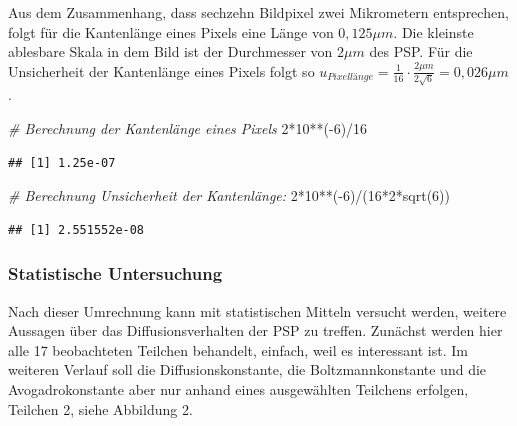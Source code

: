 \documentclass[
  9pt,
]{article}
\newenvironment{Shaded}{\begin{snugshade}}{\end{snugshade}}
\newcommand{\CommentTok}[1]{\textcolor[rgb]{0.56,0.35,0.01}{\textit{#1}}}
\newcommand{\DecValTok}[1]{\textcolor[rgb]{0.00,0.00,0.81}{#1}}
\newcommand{\FunctionTok}[1]{\textcolor[rgb]{0.00,0.00,0.00}{#1}}
\newcommand{\NormalTok}[1]{#1}
\newcommand{\SpecialCharTok}[1]{\textcolor[rgb]{0.00,0.00,0.00}{#1}}
\begin{document}
Aus dem Zusammenhang, dass sechzehn Bildpixel zwei Mikrometern
entsprechen, folgt für die Kantenlänge eines Pixels eine Länge von
\(0,125 \mu m\). Die kleinste ablesbare Skala in dem Bild ist der
Durchmesser von \(2\mu m\) des PSP. Für die Unsicherheit der Kantenlänge
eines Pixels folgt so
\(u_{Pixellänge} = \frac{1}{16}\cdot \frac{2\mu m}{2\sqrt{6}} = 0,026\mu m\).

\begin{Shaded}
\begin{Highlighting}[]
\CommentTok{\# Berechnung der Kantenlänge eines Pixels}
\DecValTok{2}\SpecialCharTok{*}\DecValTok{10}\SpecialCharTok{**}\NormalTok{(}\SpecialCharTok{{-}}\DecValTok{6}\NormalTok{)}\SpecialCharTok{/}\DecValTok{16}
\end{Highlighting}
\end{Shaded}

\begin{verbatim}
## [1] 1.25e-07
\end{verbatim}

\begin{Shaded}
\begin{Highlighting}[]
\CommentTok{\# Berechnung Unsicherheit der Kantenlänge:}
\DecValTok{2}\SpecialCharTok{*}\DecValTok{10}\SpecialCharTok{**}\NormalTok{(}\SpecialCharTok{{-}}\DecValTok{6}\NormalTok{)}\SpecialCharTok{/}\NormalTok{(}\DecValTok{16}\SpecialCharTok{*}\DecValTok{2}\SpecialCharTok{*}\FunctionTok{sqrt}\NormalTok{(}\DecValTok{6}\NormalTok{))}
\end{Highlighting}
\end{Shaded}

\begin{verbatim}
## [1] 2.551552e-08
\end{verbatim}

\hypertarget{statistische-untersuchung}{%
\subsubsection{Statistische
Untersuchung}\label{statistische-untersuchung}}

Nach dieser Umrechnung kann mit statistischen Mitteln versucht werden,
weitere Aussagen über das Diffusionsverhalten der PSP zu treffen.
Zunächst werden hier alle 17 beobachteten Teilchen behandelt, einfach,
weil es interessant ist. Im weiteren Verlauf soll die
Diffusionskonstante, die Boltzmannkonstante und die Avogadrokonstante
aber nur anhand eines ausgewählten Teilchens erfolgen, Teilchen 2, siehe
Abbildung 2.
\end{document}

